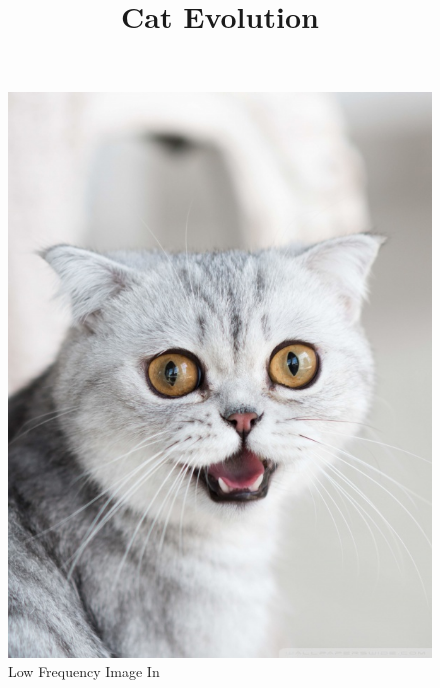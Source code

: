 \documentclass{article}
\begin{document}
\begin{figure}[!htb]
\title{\textbf{Cat Evolution}}
    \includegraphics[width=\linewidth]{cat.jpeg}
    \caption{Low Frequency Image In}\label{fig:awesome_image1}
\endminipage
{}

\end{figure}
\end{document}
